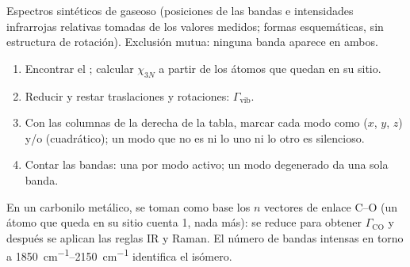 \begin{omfigure}

{\small Espectros sintéticos de  gaseoso (posiciones de las bandas e intensidades
infrarrojas relativas tomadas de los valores medidos; formas esquemáticas, sin
estructura de rotación). Exclusión mutua: ninguna banda aparece en ambos.}
\end{omfigure}

\begin{method}\label{met:b3:group-theory-applied:vibrations}
\begin{enumerate}
  \item Encontrar el ; calcular $\chi_{3N}$ a partir de los átomos que quedan en su sitio.
  \item Reducir y restar traslaciones y rotaciones: $\Gamma_{\mathrm{vib}}$.
  \item Con las columnas de la derecha de la tabla, marcar cada modo como 
        ($x$, $y$, $z$) y/o  (cuadrático); un modo que no es ni lo uno ni lo otro
        es silencioso.
  \item Contar las bandas: una por modo activo; un modo degenerado da una sola banda.
\end{enumerate}
\end{method}

\begin{method}\label{met:b3:group-theory-applied:co-count}
En un carbonilo metálico, se toman como base los $n$ vectores de enlace C--O (un átomo que queda en
su sitio cuenta 1, nada más): se reduce para obtener $\Gamma_{\mathrm{CO}}$ y después se aplican
las reglas IR y Raman. El número de bandas intensas en torno a
\qtyrange{1850}{2150}{cm^{-1}} identifica el isómero.
\end{method}


